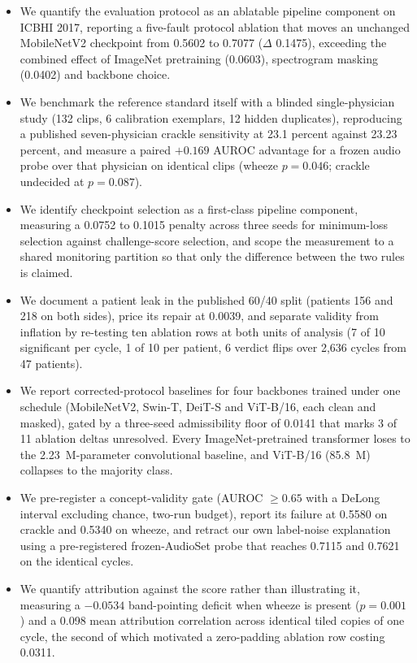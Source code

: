 \documentclass[journal,onecolumn]{IEEEtran}
\begin{document}
\begin{itemize}
\item We quantify the evaluation protocol as an ablatable pipeline component on ICBHI 2017,
reporting a five-fault protocol ablation that moves an unchanged MobileNetV2 checkpoint from
0.5602 to 0.7077 ($\Delta$ 0.1475), exceeding the combined effect of ImageNet pretraining
(0.0603), spectrogram masking (0.0402) and backbone choice.

\item We benchmark the reference standard itself with a blinded single-physician study (132
clips, 6 calibration exemplars, 12 hidden duplicates), reproducing a published seven-physician
crackle sensitivity at 23.1 percent against 23.23 percent, and measure a paired $+0.169$ AUROC
advantage for a frozen audio probe over that physician on identical clips (wheeze $p = 0.046$;
crackle undecided at $p = 0.087$).

\item We identify checkpoint selection as a first-class pipeline component, measuring a 0.0752
to 0.1015 penalty across three seeds for minimum-loss selection against challenge-score
selection, and scope the measurement to a shared monitoring partition so that only the
difference between the two rules is claimed.

\item We document a patient leak in the published 60/40 split (patients 156 and 218 on both
sides), price its repair at 0.0039, and separate validity from inflation by re-testing ten
ablation rows at both units of analysis (7 of 10 significant per cycle, 1 of 10 per patient, 6
verdict flips over 2,636 cycles from 47 patients).

\item We report corrected-protocol baselines for four backbones trained under one schedule
(MobileNetV2, Swin-T, DeiT-S and ViT-B/16, each clean and masked), gated by a three-seed
admissibility floor of 0.0141 that marks 3 of 11 ablation deltas unresolved. Every
ImageNet-pretrained transformer loses to the 2.23~M-parameter convolutional baseline, and
ViT-B/16 (85.8~M) collapses to the majority class.

\item We pre-register a concept-validity gate (AUROC $\geq 0.65$ with a DeLong interval
excluding chance, two-run budget), report its failure at 0.5580 on crackle and 0.5340 on wheeze,
and retract our own label-noise explanation using a pre-registered frozen-AudioSet probe that
reaches 0.7115 and 0.7621 on the identical cycles.



\item We quantify attribution against the score rather than illustrating it, measuring a
$-0.0534$ band-pointing deficit when wheeze is present ($p = 0.001$) and a 0.098 mean
attribution correlation across identical tiled copies of one cycle, the second of which
motivated a zero-padding ablation row costing 0.0311.
\end{itemize}
\end{document}
